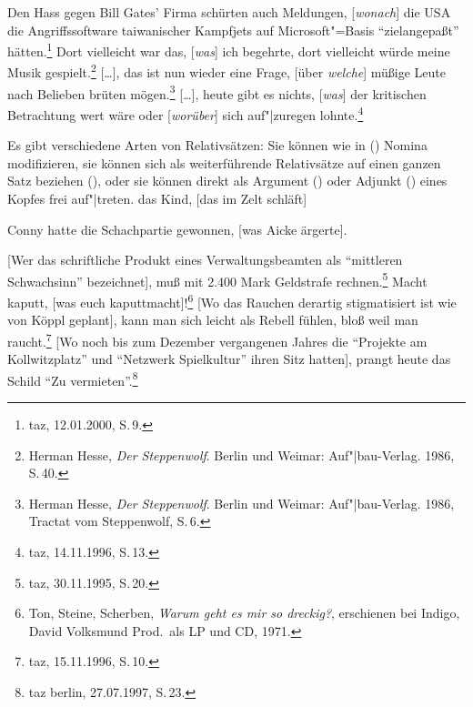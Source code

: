 {\ex Den Hass gegen Bill Gates' Firma schürten auch Meldungen, [\hspace{-.2ex}\emph{wonach}] die USA die Angriffssoftware
      taiwanischer Kampfjets auf Microsoft"=Basis "`ziel\-an\-ge\-paßt"' hätten.\footnote{
        taz, 12.01.2000, S.\,9.
      }
\ex Dort vielleicht war das, [\hspace{-.2ex}\emph{was}] ich begehrte, dort vielleicht würde meine Musik gespielt.\footnote{
                Herman Hesse, \emph{Der Steppenwolf}. Berlin und Weimar: Auf"|bau-Verlag. 1986, S.\,40.
	}\label{bsp-meine-musik}
\ex {}[\ldots], das ist nun wieder eine Frage, [über \emph{welche}] müßige Leute nach Belieben brüten
	mögen.\footnote{
                Herman Hesse, \emph{Der Steppenwolf}. Berlin und Weimar: Auf"|bau-Verlag. 1986, Tractat vom Steppenwolf, S.\,6.
	} 
\ex {}[\ldots], heute gibt es nichts, [\hspace{-.2ex}\emph{was}] der kritischen Betrachtung wert wäre oder
      \mbox{[\hspace{-.2ex}\emph{worüber}]} sich auf"|zuregen lohnte.\footnote{
	taz, 14.11.1996, S.\,13.
      }
\zl
{}

\noindent
Es gibt verschiedene Arten von Relativsätzen: Sie können wie in () Nomina modifizieren,
sie können sich als weiterführende Relativsätze auf einen ganzen Satz beziehen (), oder sie
können direkt als Argument () oder Adjunkt () eines Kopfes
frei auf"|treten.
\ea
das Kind, [das im Zelt schläft]
\z

\ea
Conny hatte die Schachpartie gewonnen, [was Aicke ärgerte].
\z                                              

\eal
\label{bsp-frei-rs-subj}
\ex {}[Wer das schriftliche Produkt eines Verwaltungsbeamten als "`mittleren Schwachsinn"' bezeichnet],
      muß mit 2.400 Mark Geldstrafe rechnen.\footnote{
        taz, 30.11.1995, S.\,20.}
\ex Macht kaputt, [was euch kaputtmacht]!\footnote{
        Ton, Steine, Scherben, \emph{Warum geht es mir so dreckig?}, erschienen bei Indigo, David Volksmund Prod.\ als LP und CD, 1971.
      }
\zl
\eal
\label{bsp-frei-rs-mod}
\ex {}[Wo das Rauchen derartig stigmatisiert ist wie von Köppl geplant], 
      kann man sich leicht als Rebell fühlen, bloß weil man raucht.\footnote{
	taz, 15.11.1996, S.\,10.
}\label{bsp-rauchen-stigmatisiert}
\ex {}[Wo noch bis zum Dezember vergangenen Jahres die "`Projekte am Kollwitzplatz"' und
      "`Netzwerk Spielkultur"' ihren Sitz hatten], prangt heute das Schild "`Zu vermieten"'.\footnote{
        taz berlin, 27.07.1997, S.\,23.
        }
\zl
}%

